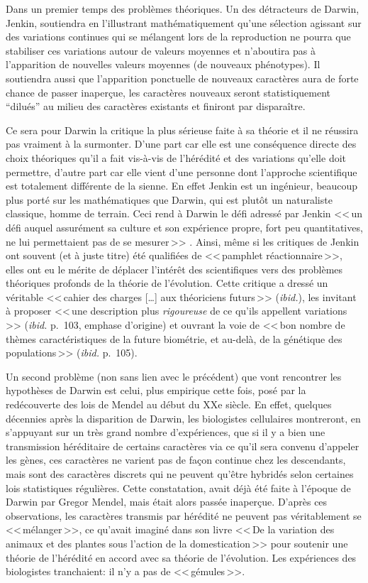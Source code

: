 Dans un premier temps des problèmes théoriques. Un des détracteurs de Darwin, Jenkin, soutiendra en l'illustrant mathématiquement qu'une sélection agissant sur des variations continues qui se mélangent lors de la reproduction ne pourra que stabiliser ces variations autour de valeurs moyennes et n'aboutira pas à l'apparition de nouvelles valeurs moyennes (de nouveaux phénotypes). Il soutiendra aussi que l'apparition ponctuelle de nouveaux caractères aura de forte chance de passer inaperçue, les caractères nouveaux seront statistiquement ``dilués'' au milieu des caractères existants et finiront par disparaître.

Ce sera pour Darwin la critique la plus sérieuse faite à sa théorie et il ne réussira pas vraiment à la surmonter. D'une part car elle est une conséquence directe des choix théoriques qu'il a fait vis-à-vis de l'hérédité et des variations qu'elle doit permettre, d'autre part car elle vient d'une personne dont l'approche scientifique est totalement différente de la sienne. En effet Jenkin est un ingénieur, beaucoup plus porté sur les mathématiques que Darwin, qui est plutôt un naturaliste classique, homme de terrain. Ceci rend à Darwin le défi adressé par Jenkin <<\,un défi auquel assurément sa culture et son expérience propre, fort peu quantitatives, ne lui permettaient pas de se mesurer\,>> \citet[p.~105]{gayon1991darwinetlapresdarwin}. Ainsi, même si les critiques de Jenkin ont souvent (et à juste titre) été qualifiées de <<\,pamphlet réactionnaire\,>>, elles ont eu le mérite de déplacer l'intérêt des scientifiques vers des problèmes théoriques profonds de la théorie de l'évolution. Cette critique a dressé un véritable <<\,cahier des charges [\ldots] aux théoriciens futurs\,>> (\emph{ibid.}), les invitant à proposer <<\,une description plus \emph{rigoureuse} de ce qu'ils appellent variations\,>> (\emph{ibid.} p.~103, emphase d'origine) et ouvrant la voie de <<\,bon nombre de thèmes caractéristiques de la future biométrie, et au-delà, de la génétique des populations\,>> (\emph{ibid.} p.~105).

Un second problème (non sans lien avec le précédent) que vont rencontrer les hypothèses de Darwin est celui, plus empirique cette fois, posé par la redécouverte des lois de Mendel au début du XXe siècle. En effet, quelques décennies après la disparition de Darwin, les biologistes cellulaires montreront, en s'appuyant sur un très grand nombre d'expériences, que si il y a bien une transmission héréditaire de certains caractères via ce qu'il sera convenu d'appeler les gènes, ces caractères ne varient pas de façon continue chez les descendants, mais sont des caractères discrets qui ne peuvent qu'être hybridés selon certaines lois statistiques régulières. Cette constatation, avait déjà été faite à l'époque de Darwin par Gregor Mendel, mais était alors passée inaperçue. D'après ces observations, les caractères transmis par hérédité ne peuvent pas véritablement se <<\,mélanger\,>>, ce qu'avait imaginé \cite{darwin1868variation} dans son livre <<\,De la variation des animaux et des plantes sous l'action de la domestication\,>> pour soutenir une théorie de l'hérédité en accord avec sa théorie de l'évolution. Les expériences des biologistes tranchaient: il n'y a pas de <<\,gémules\,>>. 


